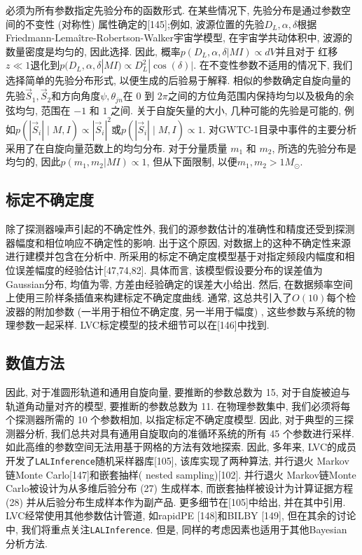 \documentclass[a4paper]{\documentclassname}
\theoremstyle{definition}
\begin{document}
必须为所有参数指定先验分布的函数形式. 在某些情况下, 先验分布是通过参数空间的不变性 (对称性) 属性确定的[145];例如, 波源位置的先验$D_L, \alpha, \delta$根据Friedmann-Lema\^{i}tre-Robertson-Walker宇宙学模型, 在宇宙学共动体积中, 波源的数量密度是均匀的, 因此选择. 因此, 概率$p (D_L,  \alpha,  \delta|M I)  \propto dV $并且对于 红移$z \ll 1$退化到$p (D_L,  \alpha,  \delta|M I)  \propto D_L^2 | \cos (\delta) |$. 在不变性参数不适用的情况下, 我们选择简单的先验分布形式, 以便生成的后验易于解释. 相似的参数确定自旋向量的先验$\vec {S}_1,  \vec {S}_2$和方向角度$\psi, \theta_{jn}$在 $0$ 到 $2\pi$之间的方位角范围内保持均匀以及极角的余弦均匀, 范围在 $-1$ 和 $1$ 之间. 关于自旋矢量的大小, 几种可能的先验是可能的, 例如$p (|\vec {S}_i|\mid M, I)  \propto |\vec {S}_i|^2$或$p (|\vec {S}_i|\mid M, I)  \propto 1$. 对GWTC-1目录中事件的主要分析采用了在自旋向量范数上的均匀分布. 对于分量质量 $m_1$ 和 $m_2$, 所选的先验分布是均匀的, 因此$p (m_1,  m_2 |M I)  \propto 1$, 但从下面限制, 以便$m_1, m_2 > 1M_{\odot}$.

\subsection{标定不确定度}

除了探测器噪声引起的不确定性外, 我们的源参数估计的准确性和精度还受到探测器幅度和相位响应不确定性的影响. 出于这个原因, 对数据上的这种不确定性来源进行建模并包含在分析中. 所采用的标定不确定度模型基于对指定频段内幅度和相位误差幅度的经验估计[47,74,82]. 具体而言, 该模型假设要分布的误差值为Gaussian分布, 均值为零, 方差由经验确定的误差大小给出. 然后, 在数据频率空间上使用三阶样条插值来构建标定不确定度曲线. 通常, 这总共引入了$O (10) $每个检波器的附加参数 (一半用于相位不确定度, 另一半用于幅度) , 这些参数与系统的物理参数一起采样. LVC标定模型的技术细节可以在[146]中找到. 

\subsection{数值方法}

因此, 对于准圆形轨道和通用自旋向量, 要推断的参数总数为 15, 对于自旋被迫与轨道角动量对齐的模型, 要推断的参数总数为 11. 在物理参数集中, 我们必须将每个探测器所需的 10 个参数相加, 以指定标定不确定度模型. 因此, 对于典型的三探测器分析, 我们总共对具有通用自旋取向的准循环系统的所有 45 个参数进行采样. 如此高维的参数空间无法用基于网格的方法有效地探索. 因此, 多年来, LVC的成员开发了\texttt{LALInference}随机采样器库[105], 该库实现了两种算法, 并行退火 Markov链Monte Carlo[147]和嵌套抽样( nested sampling)[102]. 并行退火 Markov链Monte Carlo被设计为从多维后验分布 (27) 生成样本, 而嵌套抽样被设计为计算证据方程 (28) 并从后验分布生成样本作为副产品. 更多细节在[105]中给出, 并在其中引用. LVC经常使用其他参数估计管道, 如rapidPE [148]和BILBY [149], 但在其余的讨论中, 我们将重点关注\texttt{LALInference}. 但是, 同样的考虑因素也适用于其他Bayesian 分析方法. 
\end{document}
